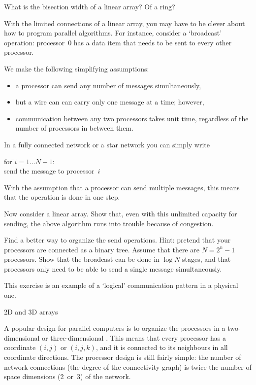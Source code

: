 \begin{exercise}
  What is the bisection width of a linear array? Of a ring?
\end{exercise}

\begin{exercise}
  With the limited connections of a linear array, you may have to be
  clever about how to program parallel algorithms. For instance,
  consider a `broadcast' operation: processor~$0$ has a data item that
  needs to be sent to every other processor. 

  We make the following simplifying assumptions:
  \begin{itemize}
  \item a processor can send any number of messages simultaneously,
  \item but a wire can can carry only one message at a time; however,
    \item communication between any two processors takes unit time,
      regardless of the number of processors in between them.
  \end{itemize}

  In a fully connected network or a star network
  you can simply write
  \begin{tabbing}
    for \=$i=1\ldots N-1$:\\ \>send the message to processor~$i$
  \end{tabbing}
  With the assumption that a processor can send multiple messages,
  this means that the operation is done in one step.

  Now consider a linear array. Show that, even with this unlimited capacity for
  sending, the above algorithm runs into trouble because of congestion.

  Find a better way to organize the send operations. Hint: pretend
  that your processors are connected as a binary tree. Assume that
  there are $N=2^n-1$ processors.
  Show that the broadcast can be done in $\log N$ stages, and that
  processors only need to be able to send a single message simultaneously.
\end{exercise}
This exercise is an example of  a
`logical' communication pattern in a physical one.

 {2D and 3D arrays}

A popular design for parallel computers is to organize the processors
in a two-dimensional or three-dimensional .
This means that every processor has a coordinate $(i,j)$ or $(i,j,k)$,
and it is connected to its neighbours in all coordinate directions.
The processor design is still fairly simple: the number of network
connections (the degree of the connectivity graph) is twice the number
of space dimensions (2~or~3) of the network.

